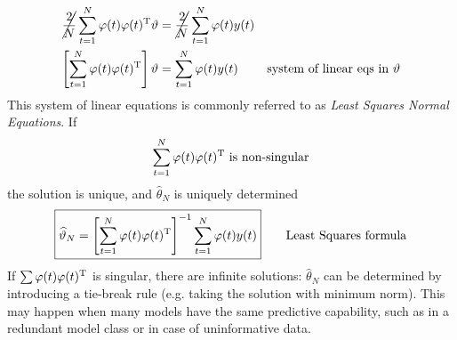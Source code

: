 \begin{align*}
\cancel{\frac{2}{N}}\sum _{t=1}^{N} \varphi (t) \varphi (t)^{\mathrm{T}} \vartheta  & =\cancel{\frac{2}{N}}\sum _{t=1}^{N} \varphi (t) y(t) & \\
\left[\sum _{t=1}^{N} \varphi (t) \varphi (t)^{\mathrm{T}}\right] \vartheta  & =\sum _{t=1}^{N} \varphi (t) y(t) & \text{system of linear eqs in} \ \vartheta 
\end{align*}
This system of linear equations is commonly referred to as \textit{Least Squares Normal Equations}. If 
\begin{equation*}
\sum _{t=1}^{N} \varphi (t) \varphi (t)^{\mathrm{T}} \ \text{is non-singular}
\end{equation*}
the solution is unique, and $ \hat{\theta }_{N}$ is uniquely determined
\begin{equation*}
\boxed{\widehat{\vartheta }_{N} =\left[\sum _{t=1}^{N} \varphi (t) \varphi (t)^{\mathrm{T}}\right]^{-1}\sum _{t=1}^{N} \varphi (t) y(t)}
\qquad \text{Least Squares formula}
\end{equation*}
If $ \sum \varphi (t) \varphi (t)^{\mathrm{T}}$ is singular, there are infinite solutions: $ \hat{\theta }_{N}$ can be determined by introducing a tie-break rule (e.g. taking the solution with minimum norm). This may happen when many models have the same predictive capability, such as in a redundant model class or in case of uninformative data.

